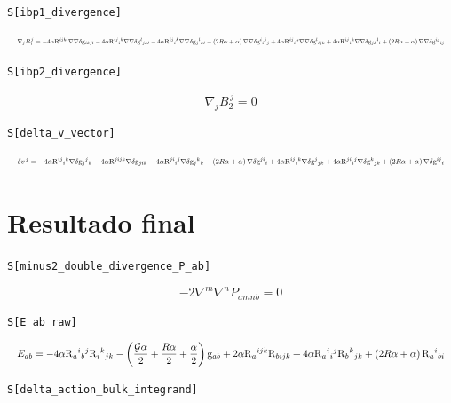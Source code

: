 \documentclass[11pt,a4paper]{article}
\begin{document}
\noindent\texttt{S[ibp1\_divergence]}

\[
\resizebox{\textwidth}{!}{$\displaystyle \nabla_j B_1^{\,j} = -4\alpha\mathrm{R}{}^{ijkl}\nabla\nabla\delta \mathrm{g}{}_{ikjl} - 4\alpha\mathrm{R}{}^{ij}{}_{i}{}^{k}\nabla\nabla\delta \mathrm{g}{}^{l}{}_{jkl} - 4\alpha\mathrm{R}{}^{ij}{}_{i}{}^{k}\nabla\nabla\delta \mathrm{g}{}_{j}{}^{l}{}_{kl} - \left(2 R \alpha + \alpha\right)\nabla\nabla\delta \mathrm{g}{}^{i}{}_{i}{}^{j}{}_{j} + 4\alpha\mathrm{R}{}^{ij}{}_{i}{}^{k}\nabla\nabla\delta \mathrm{g}{}^{l}{}_{ljk} + 4\alpha\mathrm{R}{}^{ij}{}_{i}{}^{k}\nabla\nabla\delta \mathrm{g}{}_{jk}{}^{l}{}_{l} + \left(2 R \alpha + \alpha\right)\nabla\nabla\delta \mathrm{g}{}^{ij}{}_{ij}$}
\]


\noindent\texttt{S[ibp2\_divergence]}

\[
\boxed{\nabla_j B_2^{\,j} = 0}
\]


\noindent\texttt{S[delta\_v\_vector]}

\[
\resizebox{\textwidth}{!}{$\displaystyle \delta v^{\,j} = -4\alpha\mathrm{R}{}^{ij}{}_{i}{}^{k}\nabla\delta \mathrm{g}{}_{j}{}^{j}{}_{k} - 4\alpha\mathrm{R}{}^{jijk}\nabla\delta \mathrm{g}{}_{jik} - 4\alpha\mathrm{R}{}^{ji}{}_{i}{}^{j}\nabla\delta \mathrm{g}{}_{j}{}^{k}{}_{k} - \left(2 R \alpha + \alpha\right)\nabla\delta \mathrm{g}{}^{ji}{}_{i} + 4\alpha\mathrm{R}{}^{ij}{}_{i}{}^{k}\nabla\delta \mathrm{g}{}^{j}{}_{jk} + 4\alpha\mathrm{R}{}^{ji}{}_{i}{}^{j}\nabla\delta \mathrm{g}{}^{k}{}_{jk} + \left(2 R \alpha + \alpha\right)\nabla\delta \mathrm{g}{}^{ij}{}_{i}$}
\]


\section*{Resultado final}

\noindent\texttt{S[minus2\_double\_divergence\_P\_ab]}

\[
\boxed{-2\nabla^m\nabla^n P_{amnb} = 0}
\]


\noindent\texttt{S[E\_ab\_raw]}

\[
\resizebox{\textwidth}{!}{$\displaystyle E_{ab} = -4\alpha\mathrm{R}{}_{a}{}^{i}{}_{b}{}^{j}\mathrm{R}{}_{i}{}^{k}{}_{jk} - \left(\frac{\mathcal{G} \alpha}{2} + \frac{R \alpha}{2} + \frac{\alpha}{2}\right)\mathrm{g}{}_{ab} + 2\alpha\mathrm{R}{}_{a}{}^{ijk}\mathrm{R}{}_{bijk} + 4\alpha\mathrm{R}{}_{a}{}^{i}{}_{i}{}^{j}\mathrm{R}{}_{b}{}^{k}{}_{jk} + \left(2 R \alpha + \alpha\right)\mathrm{R}{}_{a}{}^{i}{}_{bi}$}
\]


\noindent\texttt{S[delta\_action\_bulk\_integrand]}
\end{document}
